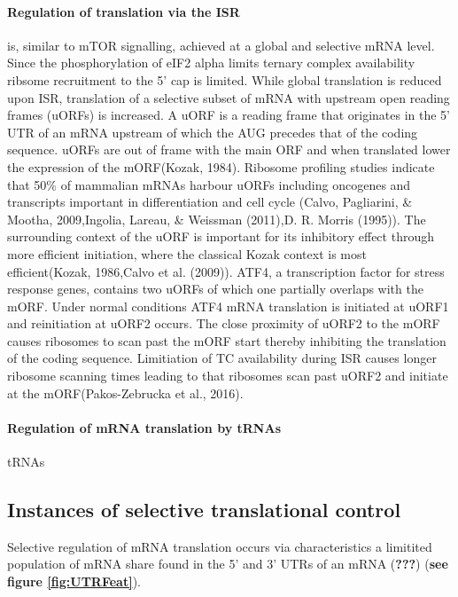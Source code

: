 \documentclass[12pt,openany]{book}
\begin{document}
\paragraph{Regulation of translation via the ISR}

is, similar to mTOR signalling, achieved at a global and selective mRNA
level. Since the phosphorylation of eIF2 alpha limits ternary complex
availability ribsome recruitment to the 5' cap is limited. While global
translation is reduced upon ISR, translation of a selective subset of
mRNA with upstream open reading frames (uORFs) is increased. A uORF is a
reading frame that originates in the 5' UTR of an mRNA upstream of which
the AUG precedes that of the coding sequence. uORFs are out of frame
with the main ORF and when translated lower the expression of the
mORF(Kozak, 1984). Ribosome profiling studies indicate that 50\% of
mammalian mRNAs harbour uORFs including oncogenes and transcripts
important in differentiation and cell cycle (Calvo, Pagliarini, \&
Mootha, 2009,Ingolia, Lareau, \& Weissman (2011),D. R. Morris (1995)).
The surrounding context of the uORF is important for its inhibitory
effect through more efficient initiation, where the classical Kozak
context is most efficient(Kozak, 1986,Calvo et al. (2009)). ATF4, a
transcription factor for stress response genes, contains two uORFs of
which one partially overlaps with the mORF. Under normal conditions ATF4
mRNA translation is initiated at uORF1 and reinitiation at uORF2 occurs.
The close proximity of uORF2 to the mORF causes ribosomes to scan past
the mORF start thereby inhibiting the translation of the coding
sequence. Limitiation of TC availability during ISR causes longer
ribosome scanning times leading to that ribosomes scan past uORF2 and
initiate at the mORF(Pakos-Zebrucka et al., 2016).

\paragraph{Regulation of mRNA translation by tRNAs} \label{tRNA}

tRNAs

\subsection{Instances of selective translational control} \label{selective}

Selective regulation of mRNA translation occurs via characteristics a
limitited population of mRNA share found in the 5' and 3' UTRs of an
mRNA ({\textbf{???}}) (\textbf{see figure \ref{fig:UTRFeat}}).
\end{document}

